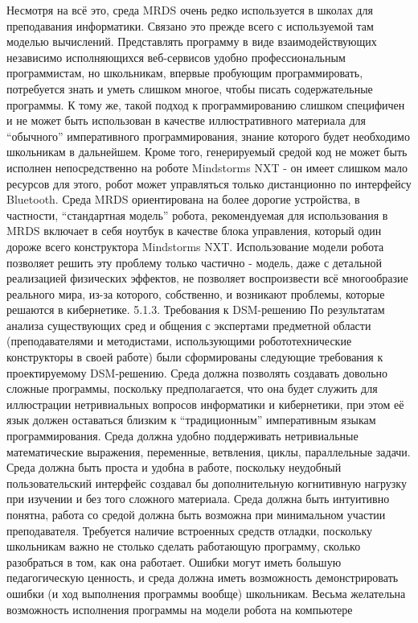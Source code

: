 Несмотря на всё это, среда MRDS очень редко используется в школах для преподавания информатики. Связано это прежде всего с используемой там моделью вычислений. Представлять программу в виде взаимодействующих независимо исполняющихся веб-сервисов удобно профессиональным программистам, но школьникам, впервые пробующим программировать, потребуется знать и уметь слишком многое, чтобы писать содержательные программы. К тому же, такой подход к программированию слишком специфичен и не может быть использован в качестве иллюстративного материала для “обычного” императивного программирования, знание которого будет необходимо школьникам в дальнейшем. Кроме того, генерируемый средой код не может быть исполнен непосредственно на роботе Mindstorms NXT - он имеет слишком мало ресурсов для этого, робот может управляться только дистанционно по интерфейсу Bluetooth. Среда MRDS ориентирована на более дорогие устройства, в частности, “стандартная модель” робота, рекомендуемая для использования в MRDS включает в себя ноутбук в качестве блока управления, который один дороже всего конструктора Mindstorms NXT. Использование модели робота позволяет решить эту проблему только частично - модель, даже с детальной реализацией физических эффектов, не позволяет воспроизвести всё многообразие реального мира, из-за которого, собственно, и возникают проблемы, которые решаются в кибернетике.
5.1.3. Требования к DSM-решению
	По результатам анализа существующих сред и общения с экспертами предметной области (преподавателями и методистами, использующими робототехнические конструкторы в своей работе) были сформированы следующие требования к проектируемому DSM-решению.
Среда должна позволять создавать довольно сложные программы, поскольку предполагается, что она будет служить для иллюстрации нетривиальных вопросов информатики и кибернетики, при этом её язык должен оставаться близким к “традиционным” императивным языкам программирования. Среда должна удобно поддерживать нетривиальные математические выражения, переменные, ветвления, циклы, параллельные задачи.
Среда должна быть проста и удобна в работе, поскольку неудобный пользовательский интерфейс создавал бы дополнительную когнитивную нагрузку при изучении и без того сложного материала. Среда должна быть интуитивно понятна, работа со средой должна быть возможна при минимальном участии преподавателя.
Требуется наличие встроенных средств отладки, поскольку школьникам важно не столько сделать работающую программу, сколько разобраться в том, как она работает. Ошибки могут иметь большую педагогическую ценность, и среда должна иметь возможность демонстрировать ошибки (и ход выполнения программы вообще) школьникам. Весьма желательна возможность исполнения программы на модели робота на компьютере
